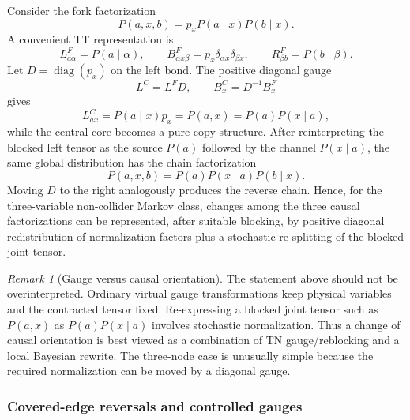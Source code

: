 \documentclass[11pt]{article}
\theoremstyle{remark}
\newtheorem{remark}[definition]{Remark}
\newcommand{\diag}{\operatorname{diag}}
\begin{document}
Consider the fork factorization
\begin{equation}
P(a,x,b)=p_x P(a\mid x)P(b\mid x).
\label{eq:fork-factorization}
\end{equation}
A convenient TT representation is
\begin{equation}
L^F_{a\alpha}=P(a\mid\alpha),\qquad
B^F_{\alpha x\beta}=p_x\delta_{\alpha x}\delta_{\beta x},\qquad
R^F_{\beta b}=P(b\mid\beta).
\end{equation}
Let $D=\diag(p_x)$ on the left bond. The positive diagonal gauge
\begin{equation}
L^C=L^F D,\qquad B^C_x=D^{-1}B^F_x
\end{equation}
gives
\begin{equation}
L^C_{ax}=P(a\mid x)p_x=P(a,x)=P(a)P(x\mid a),
\end{equation}
while the central core becomes a pure copy structure. After reinterpreting the blocked left tensor as the source $P(a)$ followed by the channel $P(x\mid a)$, the same global distribution has the chain factorization
\begin{equation}
P(a,x,b)=P(a)P(x\mid a)P(b\mid x).
\end{equation}
Moving $D$ to the right analogously produces the reverse chain. Hence, for the three-variable non-collider Markov class, changes among the three causal factorizations can be represented, after suitable blocking, by positive diagonal redistribution of normalization factors plus a stochastic re-splitting of the blocked joint tensor.

\begin{remark}[Gauge versus causal orientation]
The statement above should not be overinterpreted. Ordinary virtual gauge transformations keep physical variables and the contracted tensor fixed. Re-expressing a blocked joint tensor such as $P(a,x)$ as $P(a)P(x\mid a)$ involves stochastic normalization. Thus a change of causal orientation is best viewed as a combination of TN gauge/reblocking and a local Bayesian rewrite. The three-node case is unusually simple because the required normalization can be moved by a diagonal gauge.
\end{remark}

\subsubsection{Covered-edge reversals and controlled gauges}
\end{document}
